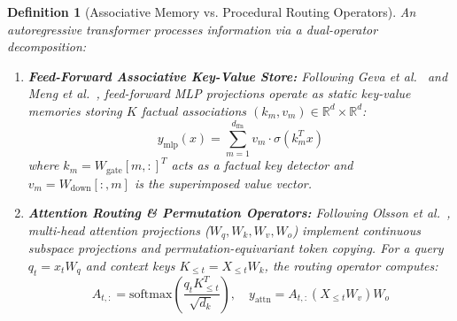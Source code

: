 \documentclass[10pt,twocolumn,letterpaper]{article}
\newtheorem{definition}{Definition}
\newcommand{\R}{\mathbb{R}}
\begin{document}
\begin{definition}[Associative Memory vs. Procedural Routing Operators]
\label{def:dual_system}
An autoregressive transformer processes information via a dual-operator decomposition:
\begin{enumerate}[leftmargin=*]
    \item \textbf{Feed-Forward Associative Key-Value Store:} Following Geva et al.~\cite{geva2021transformer} and Meng et al.~\cite{meng2022locating}, feed-forward MLP projections operate as static key-value memories storing $K$ factual associations $(k_m, v_m) \in \R^d \times \R^d$:
    \begin{equation}
        y_{\text{mlp}}(x) = \sum_{m=1}^{d_{\text{ffn}}} v_m \cdot \sigma\left( k_m^T x \right)
        \label{eq:mlp_kv}
    \end{equation}
    where $k_m = W_{\text{gate}}[m, :]^T$ acts as a factual key detector and $v_m = W_{\text{down}}[:, m]$ is the superimposed value vector.
    \item \textbf{Attention Routing \& Permutation Operators:} Following Olsson et al.~\cite{olsson2022incontext}, multi-head attention projections ($W_q, W_k, W_v, W_o$) implement continuous subspace projections and permutation-equivariant token copying. For a query $q_t = x_t W_q$ and context keys $K_{\le t} = X_{\le t} W_k$, the routing operator computes:
    \begin{equation}
        A_{t, :} = \text{softmax}\left( \frac{q_t K_{\le t}^T}{\sqrt{d_k}} \right), \quad y_{\text{attn}} = A_{t, :} (X_{\le t} W_v) W_o
        \label{eq:attn_routing}
    \end{equation}
\end{enumerate}
\end{definition}
\end{document}
